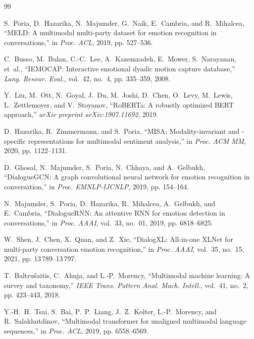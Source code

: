 \documentclass[10pt,twocolumn,letterpaper]{article}
\begin{document}
\begin{thebibliography}{99}

S.~Poria, D.~Hazarika, N.~Majumder, G.~Naik, E.~Cambria, and R.~Mihalcea,
``MELD: A multimodal multi-party dataset for emotion recognition in conversations,''
in \emph{Proc. ACL}, 2019, pp. 527--536.

C.~Busso, M.~Bulan, C.-C.~Lee, A.~Kazemzadeh, E.~Mower, S.~Narayanan, et~al.,
``IEMOCAP: Interactive emotional dyadic motion capture database,''
\emph{Lang. Resour. Eval.}, vol.~42, no.~4, pp. 335--359, 2008.

Y.~Liu, M.~Ott, N.~Goyal, J.~Du, M.~Joshi, D.~Chen, O.~Levy, M.~Lewis, L.~Zettlemoyer, and V.~Stoyanov,
``RoBERTa: A robustly optimized BERT approach,''
\emph{arXiv preprint arXiv:1907.11692}, 2019.

D.~Hazarika, R.~Zimmermann, and S.~Poria,
``MISA: Modality-invariant and -specific representations for multimodal sentiment analysis,''
in \emph{Proc. ACM MM}, 2020, pp. 1122--1131.

D.~Ghosal, N.~Majumder, S.~Poria, N.~Chhaya, and A.~Gelbukh,
``DialogueGCN: A graph convolutional neural network for emotion recognition in conversation,''
in \emph{Proc. EMNLP-IJCNLP}, 2019, pp. 154--164.

N.~Majumder, S.~Poria, D.~Hazarika, R.~Mihalcea, A.~Gelbukh, and E.~Cambria,
``DialogueRNN: An attentive RNN for emotion detection in conversations,''
in \emph{Proc. AAAI}, vol.~33, no.~01, 2019, pp. 6818--6825.

W.~Shen, J.~Chen, X.~Quan, and Z.~Xie,
``DialogXL: All-in-one XLNet for multi-party conversation emotion recognition,''
in \emph{Proc. AAAI}, vol.~35, no.~15, 2021, pp. 13\,789--13\,797.

T.~Baltru{\v{s}}aitis, C.~Ahuja, and L.-P.~Morency,
``Multimodal machine learning: A survey and taxonomy,''
\emph{IEEE Trans. Pattern Anal. Mach. Intell.}, vol.~41, no.~2, pp. 423--443, 2018.

Y.-H.~H.~Tsai, S.~Bai, P.~P.~Liang, J.~Z.~Kolter, L.-P.~Morency, and R.~Salakhutdinov,
``Multimodal transformer for unaligned multimodal language sequences,''
in \emph{Proc. ACL}, 2019, pp. 6558--6569.

\end{thebibliography}
\end{document}
